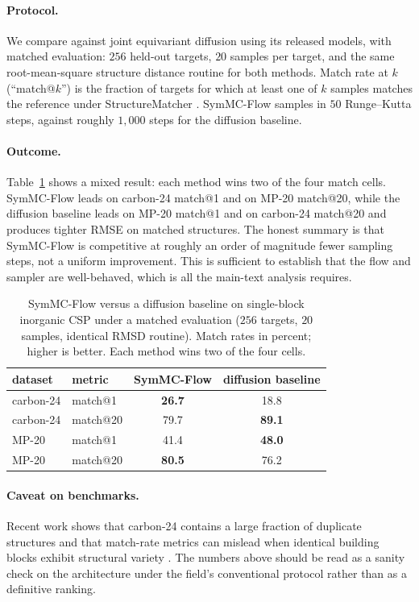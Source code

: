 \documentclass[10pt]{article}
\begin{document}
\paragraph{Protocol.} We compare against joint equivariant
diffusion \citep{jiao2023diffcsp} using its released models, with matched
evaluation: $256$ held-out targets, $20$ samples per target, and the same
root-mean-square structure distance routine for both methods. Match rate at $k$
(``match@$k$'') is the fraction of targets for which at least one of $k$ samples
matches the reference under StructureMatcher \citep{ong2013pymatgen}. SymMC-Flow
samples in $50$ Runge--Kutta steps, against roughly $1{,}000$ steps for the
diffusion baseline.

\paragraph{Outcome.} Table~\ref{tab:inorganic} shows a mixed result: each method
wins two of the four match cells. SymMC-Flow leads on carbon-24 match@1 and on
MP-20 match@20, while the diffusion baseline leads on MP-20 match@1 and on
carbon-24 match@20 and produces tighter RMSE on matched structures. The honest
summary is that SymMC-Flow is competitive at roughly an order of magnitude fewer
sampling steps, not a uniform improvement. This is sufficient to establish that
the flow and sampler are well-behaved, which is all the main-text analysis
requires.

\begin{table}[h]
\centering
\caption{SymMC-Flow versus a diffusion baseline \citep{jiao2023diffcsp} on
single-block inorganic CSP under a matched evaluation ($256$ targets, $20$
samples, identical RMSD routine). Match rates in percent; higher is better. Each
method wins two of the four cells.}
\label{tab:inorganic}
\begin{tabular}{llcc}
\toprule
dataset & metric & SymMC-Flow & diffusion baseline \\
\midrule
carbon-24 & match@1  & \textbf{26.7} & 18.8 \\
carbon-24 & match@20 & 79.7 & \textbf{89.1} \\
MP-20     & match@1  & 41.4 & \textbf{48.0} \\
MP-20     & match@20 & \textbf{80.5} & 76.2 \\
\bottomrule
\end{tabular}
\end{table}

\paragraph{Caveat on benchmarks.} Recent work shows that carbon-24 contains a
large fraction of duplicate structures and that match-rate metrics can mislead
when identical building blocks exhibit structural
variety \citep{martirossyan2025matching}. The numbers above should be read as a
sanity check on the architecture under the field's conventional protocol rather
than as a definitive ranking.
\end{document}

